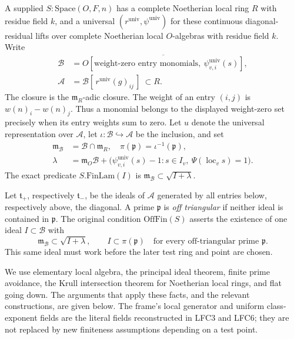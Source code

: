 \documentclass[11pt,a4paper]{article}
\numberwithin{equation}{section}
\theoremstyle{remark}\newtheorem{remark}[theorem]{Remark}
\begin{document}
A supplied \(S:\mathrm{Space}(O,F,n)\) has a complete Noetherian
local ring \(R\) with residue field \(k\), and a universal
\((r^{\mathrm{univ}},\psi^{\mathrm{univ}})\) for these continuous
diagonal-residual lifts over complete Noetherian local
\(O\)-algebras with residue field \(k\).  Write
\[
 \begin{split}
 \mathcal B&=\overline{O[\text{weight-zero entry monomials},
                         \ \psi^{\mathrm{univ}}_{v,i}(s)]},\\
 \mathcal A&=\mathcal B[\,r^{\mathrm{univ}}(g)_{ij}\,]
                                          \ \subset R.
 \end{split}                                             \tag{ACP.4}
\]
The closure is the \(\mathfrak m_R\)-adic closure.  The weight of
an entry \((i,j)\) is \(w(n)_i-w(n)_j\).  Thus a monomial belongs
to the displayed weight-zero set precisely when its entry weights
sum to zero.  Let \(u\) denote the universal representation over
\(\mathcal A\), let \(\iota:\mathcal B\hookrightarrow\mathcal A\)
be the inclusion, and set
\[
 \begin{split}
 \mathfrak m_{\mathcal B}&=\mathcal B\cap\mathfrak m_R,
 \quad\pi(\mathfrak p)=\iota^{-1}(\mathfrak p),\\
 \lambda&=\mathfrak m_O\mathcal B+
  \bigl(\psi_{v,i}^{\mathrm{univ}}(s)-1:
       s\in I_v,\ \Psi(\operatorname{loc}_v s)=1\bigr).
 \end{split}                                             \tag{ACP.5}
\]
The exact predicate \(S.\mathrm{FinLam}(I)\) is
\(\mathfrak m_{\mathcal B}\subset\sqrt{I+\lambda}\).

Let \(\mathfrak t_+\), respectively \(\mathfrak t_-\), be the
ideals of \(\mathcal A\) generated by all entries below,
respectively above, the diagonal.  A prime \(\mathfrak p\) is
\emph{off triangular} if neither ideal is contained in
\(\mathfrak p\).  The original condition \(\mathrm{OffFin}(S)\)
asserts the existence of one ideal \(I\subset\mathcal B\) with
\[
 \mathfrak m_{\mathcal B}\subset\sqrt{I+\lambda},
 \qquad I\subset\pi(\mathfrak p)
 \quad\text{for every off-triangular prime }\mathfrak p.
                                                        \tag{ACP.6}
\]
This same ideal must work before the later test ring and point are
chosen.

We use elementary local algebra, the principal ideal theorem,
finite prime avoidance, the Krull intersection theorem for
Noetherian local rings, and flat going down.  The arguments that
apply these facts, and the relevant constructions, are given below.
The frame's local generator and uniform class-exponent fields are
the literal fields reconstructed in LFC3 and LFC6; they are not
replaced by new finiteness assumptions depending on a test point.
\end{document}
